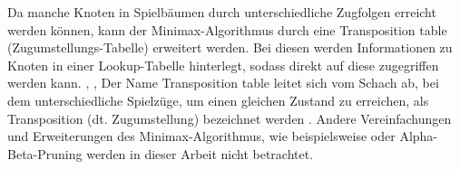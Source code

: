 


Da manche Knoten in Spielbäumen durch unterschiedliche Zugfolgen erreicht werden können, kann der Minimax-Algorithmus durch eine Transposition table (\dt Zugumstellungs-Tabelle) erweitert werden.
Bei diesen werden Informationen zu Knoten in einer Lookup-Tabelle hinterlegt, sodass direkt auf diese zugegriffen werden kann. \cite[S. 651]{millingtonArtificialIntelligenceGames2009}, \cite[S. 22]{slateCHESSNorthwesternUniversity1983}, \cite[S. 807]{greenblattGreenblattChessProgram1988}
Der Name Transposition table leitet sich vom Schach ab, bei dem unterschiedliche Spielzüge, um einen gleichen Zustand zu erreichen, als Transposition (dt. Zugumstellung) bezeichnet werden \cite[S. 651]{millingtonArtificialIntelligenceGames2009}. 
Andere Vereinfachungen und Erweiterungen des Minimax-Algorithmus, wie beispielsweise  oder Alpha-Beta-Pruning \cite[S. 115]{ertelIntroductionArtificialIntelligence2017} werden in dieser Arbeit nicht betrachtet.


